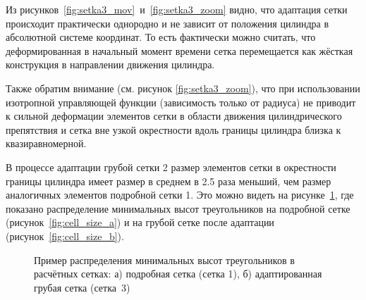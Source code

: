 Из рисунков~\ref{fig:setka3_mov}~и~\ref{fig:setka3_zoom} видно, что адаптация сетки происходит практически однородно и не зависит от положения цилиндра в абсолютной системе координат. То есть фактически можно считать, что деформированная в начальный момент времени сетка перемещается как жёсткая конструкция в направлении движения цилиндра.

Также обратим внимание (см. рисунок \ref{fig:setka3_zoom}), что при использовании изотропной управляющей функции (зависимость только от радиуса) не приводит к сильной деформации элементов сетки в области движения цилиндрического препятствия и сетка вне узкой окрестности вдоль границы цилиндра близка к квазиравномерной.

В процессе адаптации грубой сетки 2 размер элементов сетки в окрестности границы цилиндра имеет размер в среднем в 2.5 раза меньший, чем размер аналогичных элементов подробной сетки 1. Это можно видеть на рисунке~\ref{fig:cell_size}, где показано распределение минимальных высот треугольников на подробной сетке (рисунок~\ref{fig:cell_size_a}) и на грубой сетке после адаптации (рисунок~\ref{fig:cell_size_b}). 
\begin{figure}
	{\centering
		\hfill
	}
	\caption[Пример распределения минимальных высот треугольников в расчётных сетках]{Пример распределения минимальных высот треугольников в расчётных сетках: а) подробная сетка (сетка 1), б) адаптированная грубая сетка (сетка~3)}
	\label{fig:cell_size}
\end{figure}

